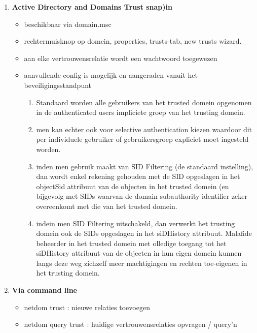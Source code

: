\begin{enumerate}
\item \textbf{Active Directory and Domains Trust snap)in}
\begin{itemize}
\item beschikbaar via domain.msc
\item rechtermuisknop op domein, properties, trusts-tab, new trusts wizard.
\item aan elke vertrouwensrelatie wordt een wachtwoord toegewezen
\item aanvullende config is mogelijk en aangeraden vanuit het beveiligingsstandpunt
\begin{enumerate}
\item Standaard worden alle gebruikers van het trusted domein opgenomen in de authenticated users impliciete groep van het trusting domein.
\item men kan echter ook voor selective authentication kiezen waardoor dit per individuele gebruiker of gebruikersgroep expliciet moet ingesteld worden.
\item inden men gebruik maakt van SID Filtering (de standaard instelling), dan wordt enkel rekening gehouden met de SID opgeslagen in het objectSid attribuut van de objecten in het trusted domein (en bijgevolg met SIDs waarvan de domain subauthority identifier zeker overeenkomt met die van het trusted domein.
\item indein men SID Filtering uitschakeld, dan verwerkt het trusting domein ook de SIDs opgeslagen in het siDHistory attribuut. Malafide beheerder in het trusted domein met olledige toegang tot het siDHistory attribuut van de objecten in hun eigen domein kunnen langs deze weg zichzelf meer machtigingen en rechten toe-eigenen in het trusting domein.
\end{enumerate}
\end{itemize}

\item \textbf{Via command line}
\begin{itemize}
\item netdom trust : nieuwe relaties toevoegen
\item netdom query trust : huidige vertrouwensrelaties opvragen / query'n
\end{itemize}
\end{enumerate}

\clearpage
